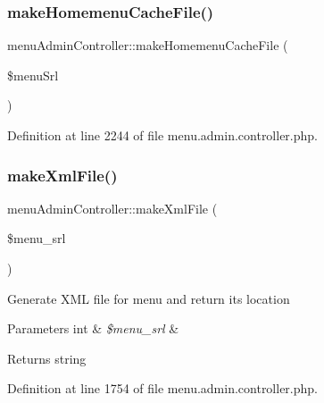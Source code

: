 \subsubsection{\texorpdfstring{make\+Homemenu\+Cache\+File()}{makeHomemenuCacheFile()}}
{\footnotesize\ttfamily menu\+Admin\+Controller\+::make\+Homemenu\+Cache\+File (\begin{DoxyParamCaption}\item[{}]{\$menu\+Srl }\end{DoxyParamCaption})}



Definition at line 2244 of file menu.\+admin.\+controller.\+php.

\hypertarget{classmenuAdminController_a1635d4c0dc3ace9e475422f9280e615e}{}\label{classmenuAdminController_a1635d4c0dc3ace9e475422f9280e615e} 
\subsubsection{\texorpdfstring{make\+Xml\+File()}{makeXmlFile()}}
{\footnotesize\ttfamily menu\+Admin\+Controller\+::make\+Xml\+File (\begin{DoxyParamCaption}\item[{}]{\$menu\+\_\+srl }\end{DoxyParamCaption})}

Generate X\+ML file for menu and return its location 
\begin{DoxyParams}[1]{Parameters}
int & {\em \$menu\+\_\+srl} & \\
\hline
\end{DoxyParams}
\begin{DoxyReturn}{Returns}
string 
\end{DoxyReturn}


Definition at line 1754 of file menu.\+admin.\+controller.\+php.

\hypertarget{classmenuAdminController_af8dacd19919e854dbe083b602ea0f183}{}\label{classmenuAdminController_af8dacd19919e854dbe083b602ea0f183} 
